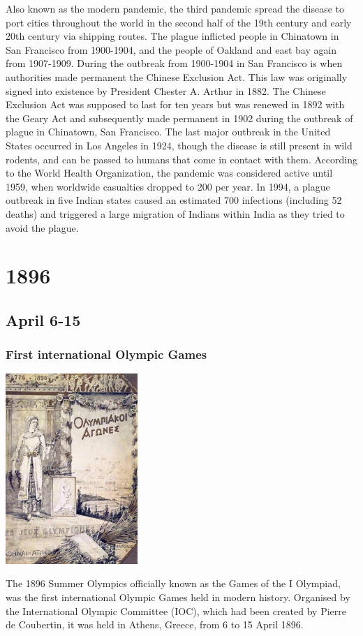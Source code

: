 \documentclass[11pt]{report}
\begin{document}
Also known as the modern pandemic, the third pandemic spread the disease to port cities throughout the world in the second half of the 19th century and early 20th century via shipping routes. The plague inflicted people in Chinatown in San Francisco from 1900-1904, and the people of Oakland and east bay again from 1907-1909. During the outbreak from 1900-1904 in San Francisco is when authorities made permanent the Chinese Exclusion Act. This law was originally signed into existence by President Chester A. Arthur in 1882. The Chinese Exclusion Act was supposed to last for ten years but was renewed in 1892 with the Geary Act and subsequently made permanent in 1902 during the outbreak of plague in Chinatown, San Francisco. The last major outbreak in the United States occurred in Los Angeles in 1924, though the disease is still present in wild rodents, and can be passed to humans that come in contact with them. According to the World Health Organization, the pandemic was considered active until 1959, when worldwide casualties dropped to 200 per year. In 1994, a plague outbreak in five Indian states caused an estimated 700 infections (including 52 deaths) and triggered a large migration of Indians within India as they tried to avoid the plague.

\chapter{1896}
\section{April 6-15}
\subsection{First international Olympic Games}
\vspace{2mm}\begin{center}\includegraphics[width=5cm]{./img/olgames.jpg}\end{center}
The 1896 Summer Olympics officially known as the Games of the I Olympiad, was the first international Olympic Games held in modern history. Organised by the International Olympic Committee (IOC), which had been created by Pierre de Coubertin, it was held in Athens, Greece, from 6 to 15 April 1896.
\end{document}
